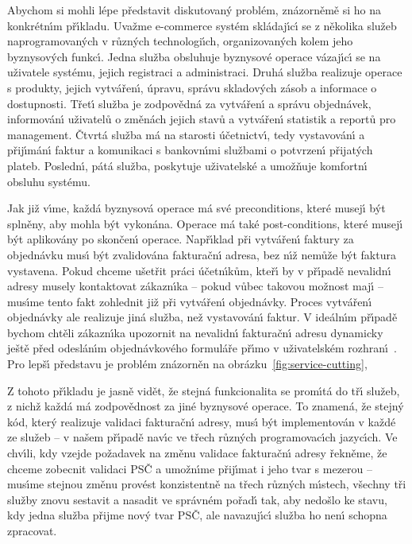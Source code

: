 Abychom si mohli lépe představit diskutovan\'y problém, znázorněmě
si ho na konkrétn\'{\i}m př\'{\i}kladu. Uvažme e-commerce systém
skládaj\'{\i}c\'{\i} se z několika služeb naprogramovan\'ych v různ\'ych technologi\'{\i}ch,
organizovan\'ych kolem jeho byznysov\'ych funkc\'{\i}.
Jedna služba obsluhuje byznysové operace vázaj\'{\i}c\'{\i}
se na uživatele systému, jejich registraci a administraci. Druhá
služba realizuje operace s produkty, jejich vytvářen\'{\i}, úpravu,
správu skladov\'ych zásob a informace o dostupnosti. Třet\'{\i} služba je
zodpovědná za vytvářen\'{\i} a správu objednávek, informován\'{\i} uživatelů
o změnách jejich stavů a vytvářen\'{\i} statistik a reportů pro management.
Čtvrtá služba má na starosti účetnictv\'{\i}, tedy vystavován\'{\i} a přij\'{\i}mán\'{\i}
faktur a komunikaci s bankovn\'{\i}mi službami o potvrzen\'{\i} přijat\'ych plateb.
Posledn\'{\i}, pátá služba, poskytuje uživatelské a umožňuje komfortn\'{\i} obsluhu systému.

Jak již v\'{\i}me, každá byznysová operace má své preconditions, které musej\'{\i} b\'yt splněny,
aby mohla b\'yt vykonána. Operace má také post-conditions, které musej\'{\i} b\'yt
aplikovány po skončen\'{\i} operace. Např\'{\i}klad při vytvářen\'{\i} faktury za
objednávku mus\'{\i} b\'yt zvalidována fakturačn\'{\i} adresa, bez n\'{\i}ž nemůže
b\'yt faktura vystavena. Pokud chceme ušetřit práci účetn\'{\i}kům, kteř\'{\i} by
v př\'{\i}padě nevalidn\'{\i} adresy musely kontaktovat zákazn\'{\i}ka – pokud vůbec
takovou možnost maj\'{\i} – mus\'{\i}me tento fakt zohlednit již při vytvářen\'{\i} objednávky.
Proces vytvářen\'{\i} objednávky ale realizuje jiná služba, než vystavován\'{\i} faktur.
V ideáln\'{\i}m př\'{\i}padě bychom chtěli zákazn\'{\i}ka upozornit na nevalidn\'{\i} fakturačn\'{\i}
adresu dynamicky ještě před odeslán\'{\i}m objednávkového formuláře př\'{\i}mo v uživatelském
rozhran\'{\i}~\cite{cemus2017separation}. Pro lepš\'{\i} představu je problém znázorněn na
obrázku~\ref{fig:service-cutting},

Z tohoto př\'{\i}kladu je jasně vidět, že stejná funkcionalita se prom\'{\i}tá
do tř\'{\i} služeb, z nichž každá má zodpovědnost za jiné byznysové operace.
To znamená, že stejn\'y kód, kter\'y realizuje validaci fakturačn\'{\i} adresy,
mus\'{\i} b\'yt implementován v každé ze služeb – v našem př\'{\i}padě nav\'{\i}c ve třech
různ\'ych programovac\'{\i}ch jazyc\'{\i}ch. Ve chv\'{\i}li, kdy vzejde požadavek na změnu
validace fakturačn\'{\i} adresy \textendash\xspace řekněme, že chceme zobecnit
validaci PSČ a umožn\'{\i}me přij\'{\i}mat i jeho tvar s mezerou – mus\'{\i}me stejnou změnu
provést konzistentně na třech různ\'ych m\'{\i}stech, všechny tři služby znovu
sestavit a nasadit ve správném pořad\'{\i} tak, aby nedošlo ke stavu,
kdy jedna služba přijme nov\'y tvar PSČ, ale navazuj\'{\i}c\'{\i} služba ho nen\'{\i}
schopna zpracovat.

